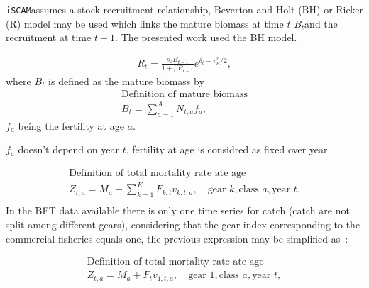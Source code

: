 \documentclass[a4paper]{article}\usepackage{graphicx, color}
\newcommand{\iscam}{\texttt{iSCAM}}
\begin{document}
\iscam assumes a stock recruitment relationship, Beverton and Holt
(BH) or Ricker (R) model may be used which links the mature biomass at
time $t$ $B_t$and the recruitment at time $t+1$. The presented work used the BH model. 


\begin{gather}
  R_t =\frac{s_0 B_{t-1}}{1+\beta B_{t-1}} e^{\delta_t - \tau^2_R/2},
\end{gather}
where $B_t$ is defined as the mature biomass by 
\begin{gather}
\mbox{Definition of mature biomass}\\
B_t= \sum_{a=1}^A N_{t,a} f_a,
\end{gather} 
$f_a$ being the fertility at age $a$. 

$f_a$ doesn't depend  on year $t$, fertility at  age is considred
  as fixed over year

  
  
\begin{gather}
  \mbox{Definition of total mortality rate ate age}\\
  Z_{t,a}= M_a + \sum_{k=1}^K F_{k,t} v_{k, t,a}, \quad \mbox{gear }k,
  \mbox{class }a, \mbox{year }t.   \\
\end{gather} 
In  the  BFT  data  available  there is  only  one  time  series  for
 catch (catch are  not split among different  gears), considering that
 the gear index corresponding to the 
commercial fisheries equals one, the previous expression may be simplified as~:

\begin{gather}
  \mbox{Definition of total mortality rate ate age}\\
  Z_{t,a}= M_a + F_t v_{1, t,a}, \quad \mbox{gear } 1,
  \mbox{class }a, \mbox{year }t,   \\
\end{gather} 
\end{document}
